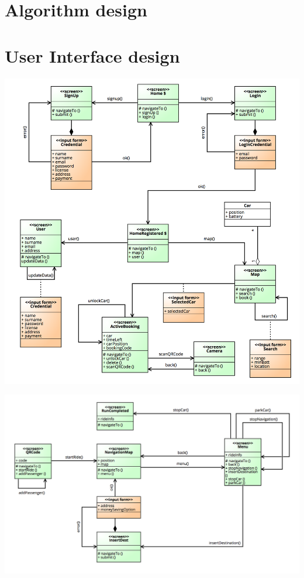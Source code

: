 \documentclass[]{article}
\begin{document}
\section{Algorithm design}\label{algorithm-design}

\section{User Interface design}\label{user-interface-design}

\centerline{\includegraphics{./images/UX_Mobile.png}}
\centerline{\includegraphics{./images/UX_Car.png}}
\end{document}
